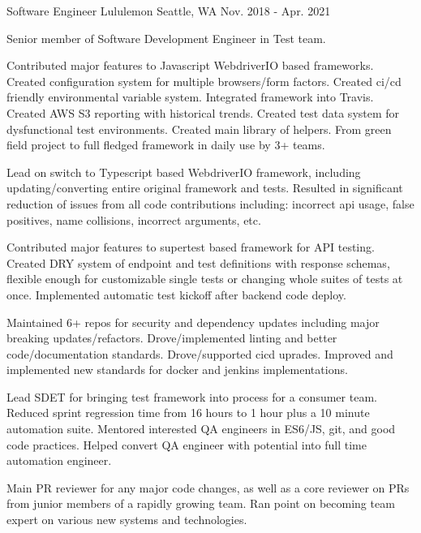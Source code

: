 \begin{cventries}
  \cventry
    {Software Engineer} %
    {Lululemon} %
    {Seattle, WA} %
    {Nov. 2018 - Apr. 2021} %
    {
      \begin{cvitems} %
        \item[] {Senior member of Software Development Engineer in Test team.}
        \item[]
        \item {Contributed major features to Javascript WebdriverIO based frameworks. Created configuration system for multiple browsers/form factors. Created ci/cd friendly environmental variable system. Integrated framework into Travis. Created AWS S3 reporting with historical trends. Created test data system for dysfunctional test environments. Created main library of helpers. From green field project to full fledged framework in daily use by 3+ teams.}
        \item {Lead on switch to Typescript based WebdriverIO framework, including updating/converting entire original framework and tests. Resulted in significant reduction of issues from all code contributions including: incorrect api usage, false positives, name collisions, incorrect arguments, etc.}
        \item {Contributed major features to supertest based framework for API testing. Created DRY system of endpoint and test definitions with response schemas, flexible enough for customizable single tests or changing whole suites of tests at once. Implemented automatic test kickoff after backend code deploy.}
        \item {Maintained 6+ repos for security and dependency updates including major breaking updates/refactors. Drove/implemented linting and better code/documentation standards. Drove/supported cicd uprades. Improved and implemented new standards for docker and jenkins implementations.}
        \item {Lead SDET for bringing test framework into process for a consumer team. Reduced sprint regression time from 16 hours to 1 hour plus a 10 minute automation suite. Mentored interested QA engineers in ES6/JS, git, and good code practices. Helped convert QA engineer with potential into full time automation engineer.}
        \item {Main PR reviewer for any major code changes, as well as a core reviewer on PRs from junior members of a rapidly growing team. Ran point on becoming team expert on various new systems and technologies.}
      \end{cvitems}
    }


\end{cventries}
